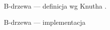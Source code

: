 \documentclass{beamer}
\begin{document}
\begin{frame}{B-drzewa --- definicja wg Knutha}
	.
\end{frame}

\begin{frame}{B-drzewa --- implementacja}
\begin{minipage}[t]{0.48\linewidth}
	\inputminted{c}{bdrzewa-impl1.c}
\end{minipage}
\begin{minipage}[t]{0.48\linewidth}
	\inputminted{c}{bdrzewa-impl2.c}
\end{minipage}
\end{frame}

%







\end{document}

